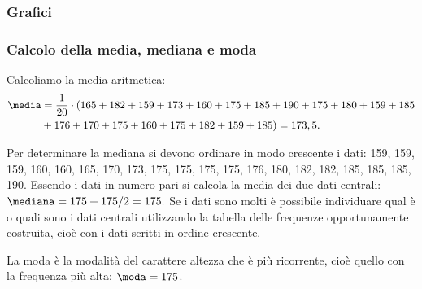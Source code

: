 \begin{esempio}
\subsubsection{Grafici}
\begin{center}
 
\end{center}

\subsubsection{Calcolo della media, mediana e moda}


Calcoliamo la media aritmetica:
\begin{equation*}
\begin{split}
\media &= \frac{1}{20} \cdot 
(165+182+159+173+160+175+185+190+175+180+159+185\\
 &+176+170+175+160+175+182+159+185)=173,5.
\end{split}
\end{equation*}


Per determinare la mediana si devono ordinare in modo crescente i dati:
159, 159, 159, 160, 160, 165, 170, 173, 175, 175, 175, 175, 176, 180, 182, 
182, 185, 185, 185, 190.
Essendo i dati in numero pari si calcola la media dei due dati centrali:
$\mediana = {175+175}/{2}=175.$
Se i dati sono molti è possibile individuare qual è o quali sono i dati 
centrali utilizzando la tabella delle
frequenze opportunamente costruita, cioè con i dati scritti in ordine 
crescente.

La moda è la modalità del carattere altezza che è più ricorrente, cioè 
quello con la frequenza più alta:
$\moda = 175$.
\end{esempio}








